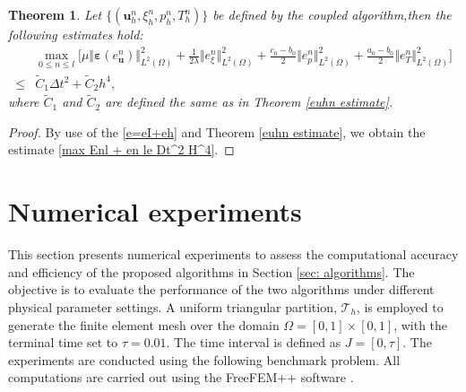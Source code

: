 \documentclass{article}
\newtheorem{theorem}{Theorem}[section]
\newtheorem{remark}{Remark}
\numberwithin{equation}{section}
\begin{document}
\begin{theorem}
 Let $\{(\bm u_h^n,\xi_h^n,p_h^n,T_h^n)\}$ be defined by the coupled algorithm,then the following
 estimates hold:
\begin{equation}\label{max Enl + en le Dt^2 H^4}
\begin{aligned} 
& \max_{0\le n\le l}\Big[
   \mu\Vert\bm\varepsilon(e_{\bm u}^n)\Vert_{L^2(\Omega)}^2  
  +\frac1{2\lambda} \Vert e_\xi^n\Vert_{L^2(\Omega)}^2
  +\frac{c_0-b_0}{2} \Vert  e_p^n\Vert_{L^2(\Omega)}^2  
  +\frac{a_0-b_0}{2} \Vert  e_T^n\Vert_{L^2(\Omega)}^2 
                   \Big]\\
\le &  \tilde C_1\Delta t^2 + \tilde C_2 h^4,             
\end{aligned}
\end{equation} 
 where $\tilde C_1$ and $\tilde C_2$ are defined the same as in Theorem \ref{euhn estimate}.

\end{theorem}
\begin{proof} 
By use of the \eqref{e=eI+eh} and Theorem \ref{euhn estimate}, we obtain the estimate \eqref{max Enl + en le Dt^2 H^4}.


\end{proof}
 
\section{Numerical experiments}\label{sec: experiments}

This section presents numerical experiments to assess the computational accuracy and efficiency of the proposed algorithms in Section \ref{sec: algorithms}. The objective is to evaluate the performance of the two algorithms under different physical parameter settings. A uniform triangular partition, \(\mathcal{T}_h\), is employed to generate the finite element mesh over the domain \(\Omega = [0,1] \times [0,1]\), with the terminal time set to \(\tau = 0.01\). The time interval is defined as \(J = [0, \tau]\). The experiments are conducted using the following benchmark problem. 
All computations are carried out using the FreeFEM++ software \cite{Hecht2012NewDI}.
\end{document}
